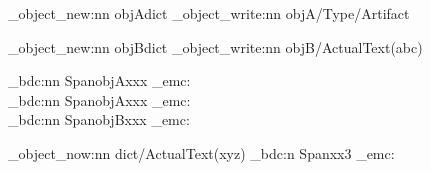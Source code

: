 \documentclass{article}
\begin{document}
\ExplSyntaxOn
\pdf_object_new:nn   {objA}{dict}
\pdf_object_write:nn {objA}{/Type/Artifact}

\pdf_object_new:nn   {objB}{dict}
\pdf_object_write:nn {objB}{/ActualText(abc)}

\vspace*{44\baselineskip}
\pdf_bdc:nn {Span}{objA}xxx
\pdf_emc:
\\
\pdf_bdc:nn {Span}{objA}xxx
\pdf_emc:
\\
\pdf_bdc:nn {Span}{objB}xxx
\pdf_emc:

\pdf_object_now:nn {dict}{/ActualText(xyz)}
\pdf_bdc:n {Span}xx3
\pdf_emc:

\ExplSyntaxOff
\end{document}
